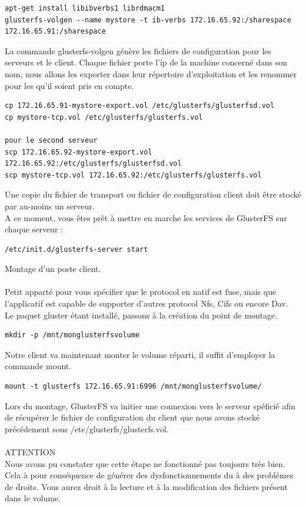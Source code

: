 \documentclass[12pt]{report}
\begin{document}
\begin{lstlisting}
apt-get install libibverbs1 librdmacm1
glusterfs-volgen --name mystore -t ib-verbs 172.16.65.92:/sharespace 172.16.65.91:/sharespace
	  \end{lstlisting}
La commande glusterfs-volgen génère les fichiers de configuration pour les serveurs et le client. Chaque fichier porte l'ip de la machine concerné dans son nom, nous allons les exporter dans leur répertoire d'exploitation et les renommer pour les qu'il soient pris en compte.
\begin{lstlisting}
cp 172.16.65.91-mystore-export.vol /etc/glusterfs/glusterfsd.vol
cp mystore-tcp.vol /etc/glusterfs/glusterfs.vol

pour le second serveur
scp 172.16.65.92-mystore-export.vol 172.16.65.92:/etc/glusterfs/glusterfsd.vol
scp mystore-tcp.vol 172.16.65.92:/etc/glusterfs/glusterfs.vol
	  \end{lstlisting}
Une copie du fichier de transport ou fichier de configuration client doit être stocké par au-moins un serveur.\\
A ce moment, vous êtes prêt à mettre en marche les services de GlusterFS sur chaque serveur :
\begin{lstlisting}
/etc/init.d/glusterfs-server start
	  \end{lstlisting}
Montage d'un poste client.\\\\
Petit apparté pour vous spécifier que le protocol en natif est fuse, mais que l'applicatif est capable de supporter d'autres protocol Nfs, Cifs ou encore Dav.\\
Le paquet gluster étant installé, passons à la création du point de montage.
\begin{lstlisting}
mkdir -p /mnt/monglusterfsvolume
	  \end{lstlisting}
Notre client va maintenant monter le volume réparti, il suffit d'employer la commande mount.
\begin{lstlisting}
mount -t glusterfs 172.16.65.91:6996 /mnt/monglusterfsvolume/
	  \end{lstlisting}
Lors du montage, GlusterFS va initier une connexion vers le serveur spéficié afin de récupérer le fichier de configuration du client que nous avons stocké précédement sous /etc/glusterfs/glusterfs.vol.\\\\
ATTENTION\\
Nous avons pu constater que cette étape ne fonctionné pas toujours très bien. Cela à pour conséquence de générer des dysfonctionnements du à des problémes de droits. Vous aurez droit à la lecture et à la modification des fichiers présent dans le volume.\\
\end{document}
